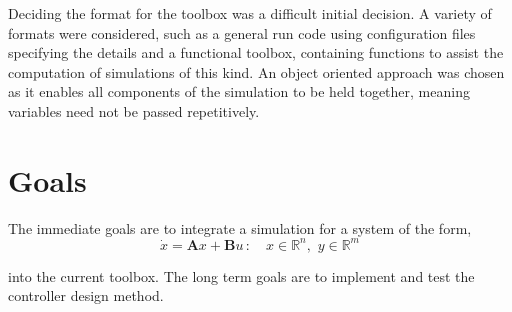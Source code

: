 \documentclass[11pt,a4paper]{article}
\begin{document}
Deciding the format for the toolbox was a difficult initial decision. A variety of formats were considered, such as a general run code using configuration files specifying the details and a functional toolbox, containing functions to assist the computation of simulations of this kind. An object oriented approach was chosen as it enables all components of the simulation to be held together, meaning variables need not be passed repetitively.

\section{Goals}
The immediate goals are to integrate a simulation for a system of the form,
$$ \dot{x} = \textbf{A}x + \textbf{B}u \,: \quad x \in \mathbb{R}^{n},\,\, y \in \mathbb{R}^m$$

into the current toolbox. The long term goals are to implement and test the controller design method.



\end{document}

